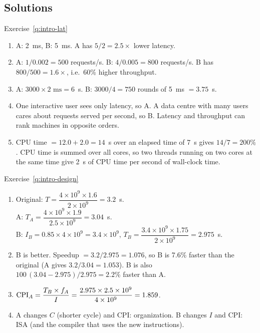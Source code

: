 \subsection{Solutions}
\label{sec:intro-sol}

\begin{noot}{Exercise~\ref{q:intro-lat}}
\begin{enumerate}[label=(\alph*),leftmargin=*]
  \item A: 2~ms, B: 5~ms. A has $5/2=2.5\times$ lower latency.
  \item A: $1/0.002=500$ requests/s. B: $4/0.005=800$ requests/s. B has
  $800/500=1.6\times$, i.e.\ 60\% higher throughput.
  \item A: $3000\times2\text{ ms}=6$~s. B: $3000/4=750$ rounds of 5~ms
  $=3.75$~s.
  \item One interactive user sees only latency, so A. A data centre with many
  users cares about requests served per second, so B. Latency and throughput can
  rank machines in opposite orders.
  \item CPU time $=12.0+2.0=14$~s over an elapsed time of 7~s gives
  $14/7=200\%$. CPU time is summed over all cores, so two threads running on two
  cores at the same time give 2~s of CPU time per second of wall-clock time.
\end{enumerate}
\end{noot}

\begin{noot}{Exercise~\ref{q:intro-design}}
\begin{enumerate}[label=(\alph*),leftmargin=*]
  \item Original: $T=\dfrac{4\times10^9\times1.6}{2\times10^9}=3.2$~s.\\
  A: $T_A=\dfrac{4\times10^9\times1.9}{2.5\times10^9}=3.04$~s.\\
  B: $I_B=0.85\times4\times10^9=3.4\times10^9$,
  $T_B=\dfrac{3.4\times10^9\times1.75}{2\times10^9}=2.975$~s.
  \item B is better. Speedup $=3.2/2.975=1.076$, so B is 7.6\% faster than the
  original (A gives $3.2/3.04=1.053$). B is also
  $100\,(3.04-2.975)/2.975=2.2\%$ faster than A.
  \item $\mathrm{CPI}_A=\dfrac{T_B\times f_A}{I}=\dfrac{2.975\times2.5\times10^9}{4\times10^9}=1.859$.
  \item A changes $C$ (shorter cycle) and CPI: organization. B changes $I$
  and CPI: ISA (and the compiler that uses the new instructions).
\end{enumerate}
\end{noot}

